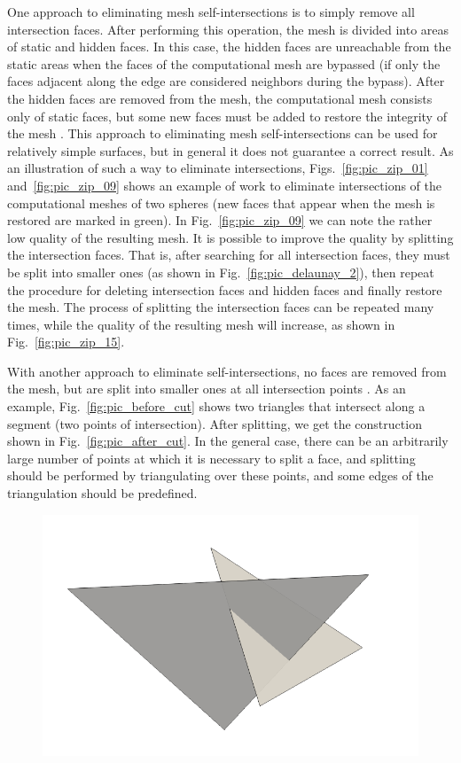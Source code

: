 One approach to eliminating mesh self-intersections is to simply remove all intersection faces.
After performing this operation, the mesh is divided into areas of static and hidden faces.
In this case, the hidden faces are unreachable from the static areas when the faces of the computational mesh are bypassed (if only the faces adjacent along the edge are considered neighbors during the bypass).
After the hidden faces are removed from the mesh, the computational mesh consists only of static faces, but some new faces must be added to restore the integrity of the mesh \cite{Charton}.
This approach to eliminating mesh self-intersections can be used for relatively simple surfaces, but in general it does not guarantee a correct result.
As an illustration of such a way to eliminate intersections,
Figs.~\ref{fig:pic_zip_01} and~\ref{fig:pic_zip_09} shows an example
of work to eliminate intersections of the computational meshes of
two spheres (new faces that appear when the mesh is restored are
marked in green).
In Fig.~\ref{fig:pic_zip_09} we can note the rather low quality of the resulting mesh.
It is possible to improve the quality by splitting the intersection faces.
That is, after searching for all intersection faces, they must be split into smaller ones (as shown in Fig.~\ref{fig:pic_delaunay_2}), then repeat the procedure for deleting intersection faces and hidden faces and finally restore the mesh.
The process of splitting the intersection faces can be repeated many times, while the quality of the resulting mesh will increase, as shown in Fig.~\ref{fig:pic_zip_15}.

With another approach to eliminate self-intersections, no faces are removed from the mesh, but are split into smaller ones at all intersection points \cite{Skvorkovska}.
As an example, Fig.~\ref{fig:pic_before_cut} shows two triangles that intersect along a segment (two points of intersection).
After splitting, we get the construction shown in Fig.~\ref{fig:pic_after_cut}.
In the general case, there can be an arbitrarily large number of points at which it is necessary to split a face, and splitting should be performed by triangulating over these points, and some edges of the triangulation should be predefined.

\begin{figure}[h]
\centering
\includegraphics[width=\textwidth]{pics/text_1_int/pic_before_cut.png}
\end{figure}

